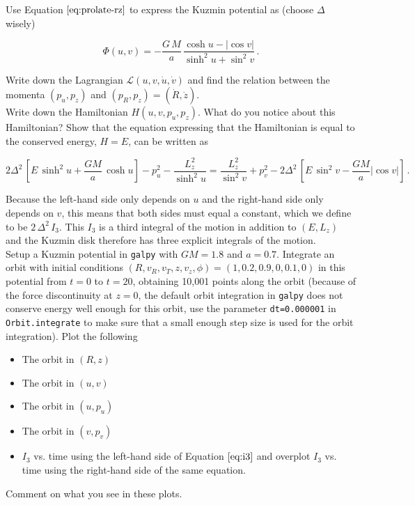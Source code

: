 \documentclass[12pt]{article}
\begin{document}
 Use Equation $\eqref{eq:prolate-rz}$ to express the
Kuzmin potential as (choose $\Delta$ wisely)

\begin{equation}
  \Phi(u,v) = -\frac{G\,M}{a}\,\frac{\cosh u - |\cos v|}{\sinh^2 u + \sin^2 v}\,.
\end{equation}

 Write down the Lagrangian
$\mathcal{L}(u,v,\dot{u},\dot{v})$ and find the relation between the
momenta $(p_u,p_z)$ and $(p_R,p_z) = (\dot{R},\dot{z})$.\\

 Write down the Hamiltonian $H(u,v,p_u,p_z)$. What
do you notice about this Hamiltonian? Show that the equation
expressing that the Hamiltonian is equal to the conserved energy,
$H=E$, can be written as

\begin{equation}\label{eq:i3}
  2\Delta^2\,\left[E\,\sinh^2 u + \frac{GM}{a}\,\cosh u\right] -p_u^2-\frac{L_z^2}{\sinh^2 u} = \frac{L_z^2}{\sin^2 v}+p_v^2-2\Delta^2\,\left[E\,\sin^2 v -\frac{GM}{a} |\cos v|\right]\,.
\end{equation}

Because the left-hand side only depends on $u$ and the right-hand side
only depends on $v$, this means that both sides must equal a constant,
which we define to be $2\,\Delta^2\,I_3$. This $I_3$ is a third
integral of the motion in addition to $(E,L_z)$ and the Kuzmin disk
therefore has three explicit integrals of the motion.\\

 Setup a Kuzmin potential in \texttt{galpy} with $GM
= 1.8$ and $a = 0.7$. Integrate an orbit with initial conditions
$(R,v_R,v_T,z,v_z,\phi) = (1,0.2,0.9,0,0.1,0)$ in this potential from
$t=0$ to $t=20$, obtaining 10,001 points along the orbit (because of
the force discontinuity at $z=0$, the default orbit integration in
\texttt{galpy} does not conserve energy well enough for this orbit,
use the parameter \texttt{dt=0.000001} in \texttt{Orbit.integrate} to
make sure that a small enough step size is used for the orbit
integration). Plot the following
\begin{itemize}
\item The orbit in $(R,z)$
\item The orbit in $(u,v)$
\item The orbit in $(u,p_u)$
\item The orbit in $(v,p_v)$
\item $I_3$ vs. time using the left-hand side of Equation
  $\eqref{eq:i3}$ and overplot $I_3$ vs. time using the right-hand
  side of the same equation.
\end{itemize}

Comment on what you see in these plots.
\end{document}
